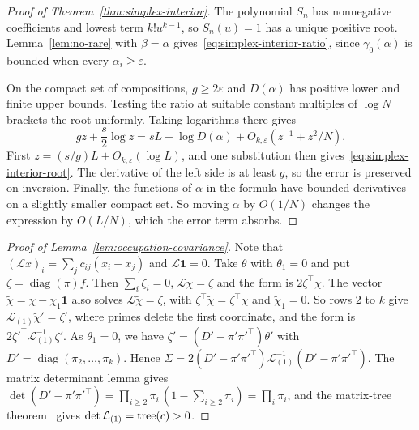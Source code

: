 \begin{proof}[Proof of Theorem~\ref{thm:simplex-interior}]
The polynomial $S_n$ has nonnegative coefficients and lowest term $k!u^{k-1}$,
so $S_n(u)=1$ has a unique positive root. Lemma~\ref{lem:no-rare} with
$\beta=\alpha$ gives~\eqref{eq:simplex-interior-ratio}, since $\gamma_0(\alpha)$
is bounded when every $\alpha_i\ge\varepsilon$.

On the compact set of compositions, $g\ge2\varepsilon$ and $D(\alpha)$ has
positive lower and finite upper bounds. Testing the ratio at suitable constant
multiples of $\log N$ brackets the root uniformly. Taking logarithms there gives
\[
gz+\frac s2\log z=sL-\log D(\alpha)+O_{k,\varepsilon}(z^{-1}+z^2/N).
\]
First $z=(s/g)L+O_{k,\varepsilon}(\log L)$, and one substitution then
gives~\eqref{eq:simplex-interior-root}. The derivative of the left side is at
least $g$, so the error is preserved on inversion. Finally, the functions of
$\alpha$ in the formula have bounded derivatives on a slightly smaller compact
set. So moving $\alpha$ by $O(1/N)$ changes the expression by $O(L/N)$, which the
error term absorbs.
\end{proof}

\begin{proof}[Proof of Lemma~\ref{lem:occupation-covariance}]
Note that $(\mathcal Lx)_i=\sum_jc_{ij}(x_i-x_j)$ and $\mathcal L\mathbf1=0$. Take
$\theta$ with $\theta_1=0$ and put $\zeta=\operatorname{diag}(\pi)f$. Then
$\sum_i\zeta_i=0$, $\mathcal L\chi=\zeta$ and the form is $2\zeta^\top\chi$. The
vector $\tilde\chi=\chi-\chi_1\mathbf1$ also solves $\mathcal L\tilde\chi=\zeta$,
with $\zeta^\top\tilde\chi=\zeta^\top\chi$ and $\tilde\chi_1=0$. So rows $2$ to
$k$ give $\mathcal L_{(1)}\tilde\chi'=\zeta'$, where primes delete the first
coordinate, and
the form is $2\zeta'^\top\mathcal L_{(1)}^{-1}\zeta'$. As $\theta_1=0$, we have
$\zeta'=(D'-\pi'\pi'^\top)\theta'$ with $D'=\operatorname{diag}(\pi_2,\ldots,\pi_k)$.
Hence $\Sigma=2(D'-\pi'\pi'^\top)\mathcal L_{(1)}^{-1}(D'-\pi'\pi'^\top)$. The
matrix determinant lemma gives
$\det(D'-\pi'\pi'^\top)=\prod_{i\ge2}\pi_i\,(1-\sum_{i\ge2}\pi_i)=\prod_i\pi_i$,
and the matrix-tree theorem~\cite{bollobas1998} gives
$\det\mathcal L_{(1)}=\operatorname{tree}(c)>0$.
\end{proof}

